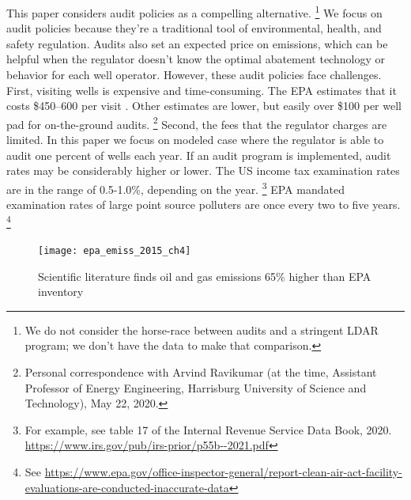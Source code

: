\documentclass[12pt,oneside,letterpaper]{article}
\theoremstyle{definition}
\begin{document}
\begin{refsection}
This paper considers audit policies as a compelling alternative.%
\footnote{%
We do not consider the horse-race between audits and a stringent \gls{LDAR} program;
we don't have the data to make that comparison.
}
We focus on audit policies because they're a traditional tool of environmental, health, and safety regulation.
Audits also set an expected price on emissions, which can be helpful when the regulator doesn't know the optimal abatement technology or behavior for each well operator.
However, these audit policies face challenges.
First, visiting wells is expensive and time-consuming.
The \gls{EPA} estimates that it costs \$450--600 per visit \parencite{epaRule2020}.
Other estimates are lower, but easily over \$100 per well pad for on-the-ground audits.%
\footnote{Personal correspondence with Arvind Ravikumar (at the time, Assistant Professor of Energy Engineering, Harrisburg University of Science and Technology), May 22, 2020.}
Second, the fees that the regulator charges are limited.
In this paper we focus on modeled case where the regulator is able to audit one percent of wells each year.
If an audit program is implemented, audit rates may be considerably higher or lower.
The US income tax examination rates are in the range of 0.5-1.0\%, depending on the year.%
\footnote{For example, see table 17 of the Internal Revenue Service Data Book, 2020.
\url{https://www.irs.gov/pub/irs-prior/p55b--2021.pdf}}
\gls{EPA} mandated examination rates of large point source polluters are once every two to five years.%
\footnote{See \href{https://www.epa.gov/office-inspector-general/report-clean-air-act-facility-evaluations-are-conducted-inaccurate-data}{https://www.epa.gov/office-inspector-general/report-clean-air-act-facility-evaluations-are-conducted-inaccurate-data}}


\begin{figure}
\vspace*{-0.385\baselineskip}

\centering
\begin{minipage}{0.45\textwidth}
  \caption{Scientific literature finds oil and gas emissions 65\% higher than \gls{EPA} inventory}
  \label{fig:epa-inventory-comparison}
\end{minipage}

\noindent
\texttt{[image: epa\_emiss\_2015\_ch4]}
\vspace*{-2\baselineskip}
\end{figure}


\end{refsection}
\end{document}
